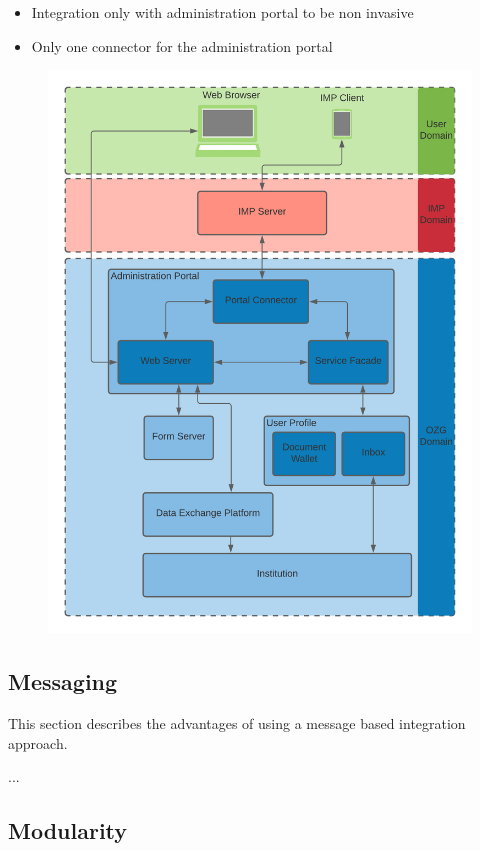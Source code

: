 \begin{itemize}
    \item Integration only with administration portal to be non invasive
    \item Only one connector for the administration portal
\end{itemize}

\begin{figure}[h]
    \centering
    \includegraphics[scale=0.15]{Diagrams/Integration Architecture 1/Overview.png}
\end{figure}

\subsection{Messaging}

This section describes the advantages of using a message based integration approach.

...

\subsection{Modularity}

